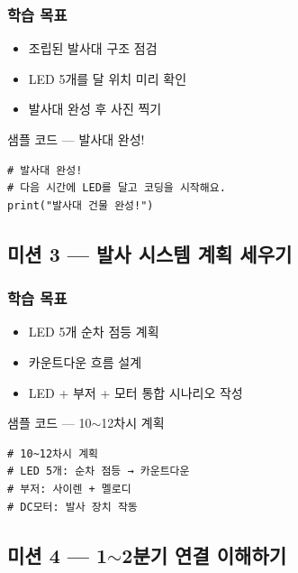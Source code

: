 \subsubsection*{학습 목표}
\begin{itemize}[leftmargin=1.4em]
  \item 조립된 발사대 구조 점검
  \item LED 5개를 달 위치 미리 확인
  \item 발사대 완성 후 사진 찍기
\end{itemize}

\begin{labbox}{샘플 코드 --- 발사대 완성!}
\begin{verbatim}
# 발사대 완성!
# 다음 시간에 LED를 달고 코딩을 시작해요.
print("발사대 건물 완성!")
\end{verbatim}
\end{labbox}

\subsection{미션 3 --- 발사 시스템 계획 세우기}
\label{subsec:ch09-m3}

\begin{storybox}
\end{storybox}

\subsubsection*{학습 목표}
\begin{itemize}[leftmargin=1.4em]
  \item LED 5개 순차 점등 계획
  \item 카운트다운 흐름 설계
  \item LED + 부저 + 모터 통합 시나리오 작성
\end{itemize}

\begin{labbox}{샘플 코드 --- 10$\sim$12차시 계획}
\begin{verbatim}
# 10~12차시 계획
# LED 5개: 순차 점등 → 카운트다운
# 부저: 사이렌 + 멜로디
# DC모터: 발사 장치 작동
\end{verbatim}
\end{labbox}

\subsection{미션 4 --- 1$\sim$2분기 연결 이해하기}
\label{subsec:ch09-m4}

